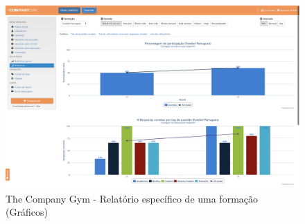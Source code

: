 \begin{figure}[ht!]
	\begin{center}
		\includegraphics[width=1\textwidth]{img/tcg/tcg-data-f.png}
		\caption{The Company Gym - Relatório específico de uma formação (Gráficos)}
		\label{fig:tcg-data-f}
	\end{center}
\end{figure}
\pagebreak

